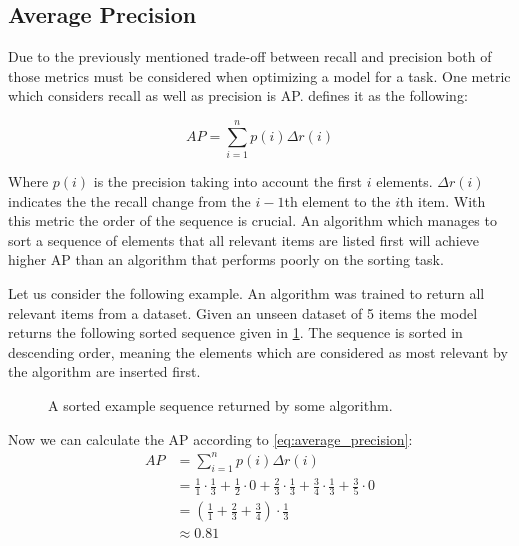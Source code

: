 \subsection{Average Precision}
\label{chp:fundamentals:sec:metrics:subsec:average_precision}

Due to the previously mentioned trade-off between recall and precision both of those metrics must be considered when optimizing a model for a task.
One metric which considers recall as well as precision is \ac{AP}.
\Textcite{Zhu:2004} defines it as the following:

\begin{equation}\label{eq:average_precision}
    AP = \sum_{i=1}^n {p(i)\Delta r(i)}
\end{equation}

Where $p(i)$ is the precision taking into account the first $i$ elements.
$\Delta r(i)$ indicates the the recall change from the $i-1$th element to the $i$th item.
With this metric the order of the sequence is crucial.
An algorithm which manages to sort a sequence of elements that all relevant items are listed first will achieve higher AP than an algorithm that performs poorly on the sorting task.

Let us consider the following example.
An algorithm was trained to return all relevant items from a dataset.
Given an unseen dataset of 5 items the model returns the following sorted sequence given in \cref{fig:metrics:average_precision:sample}.
The sequence is sorted in descending order, meaning the elements which are considered as most relevant by the algorithm are inserted first.

\begin{figure}[htpb]
    \centering
    \def\svgwidth{\columnwidth}
    
    \caption[Example Sequence]{A sorted example sequence returned by some algorithm.}\label{fig:metrics:average_precision:sample}
\end{figure}

Now we can calculate the \ac{AP} according to \cref{eq:average_precision}:
\begin{equation}
    \begin{aligned}
        AP &= \sum_{i=1}^n {p(i)\Delta r(i)}\\
        &= \frac{1}{1} \cdot \frac{1}{3} + \frac{1}{2} \cdot 0 + \frac{2}{3} \cdot \frac{1}{3} + \frac{3}{4} \cdot \frac{1}{3} + \frac{3}{5} \cdot 0\\
        &=  (\frac{1}{1} + \frac{2}{3}  + \frac{3}{4}) \cdot \frac{1}{3}\\
        &\approx 0.81
    \end{aligned}
\end{equation}

